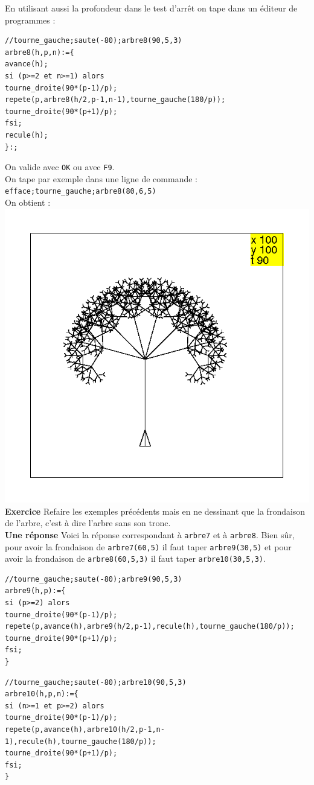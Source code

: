 \documentclass[a4paper,11pt]{book}
\begin{document}
En utilisant aussi la profondeur dans le test d'arr\^et on tape dans un 
\'editeur de programmes :
\begin{verbatim}
//tourne_gauche;saute(-80);arbre8(90,5,3)
arbre8(h,p,n):={
avance(h);
si (p>=2 et n>=1) alors
tourne_droite(90*(p-1)/p);
repete(p,arbre8(h/2,p-1,n-1),tourne_gauche(180/p));
tourne_droite(90*(p+1)/p);
fsi;
recule(h);
}:;
\end{verbatim}
On valide avec {\tt OK} ou avec {\tt F9}.\\
On tape par exemple dans une ligne de commande :\\
{\tt efface;tourne\_gauche;arbre8(80,6,5)}\\
On obtient :\\
\includegraphics[width=\textwidth]{tortarb8}\\

{\bf Exercice}
Refaire les exemples pr\'ec\'edents mais en ne dessinant que la frondaison de 
l'arbre, c'est \`a dire l'arbre sans son tronc.\\
{\bf Une r\'eponse}
Voici la r\'eponse correspondant \`a {\tt arbre7} et \`a {\tt arbre8}. Bien 
s\^ur, pour avoir la frondaison de {\tt arbre7(60,5)} il faut taper 
{\tt arbre9(30,5)} et pour avoir la frondaison de {\tt arbre8(60,5,3)} il faut 
taper {\tt arbre10(30,5,3)}.
\begin{verbatim}
//tourne_gauche;saute(-80);arbre9(90,5,3)
arbre9(h,p):={
si (p>=2) alors
tourne_droite(90*(p-1)/p);
repete(p,avance(h),arbre9(h/2,p-1),recule(h),tourne_gauche(180/p));
tourne_droite(90*(p+1)/p);
fsi;
}
\end{verbatim}
\begin{verbatim}
//tourne_gauche;saute(-80);arbre10(90,5,3)
arbre10(h,p,n):={
si (n>=1 et p>=2) alors
tourne_droite(90*(p-1)/p);
repete(p,avance(h),arbre10(h/2,p-1,n-1),recule(h),tourne_gauche(180/p));
tourne_droite(90*(p+1)/p);
fsi;
}
\end{verbatim}
\end{document}
